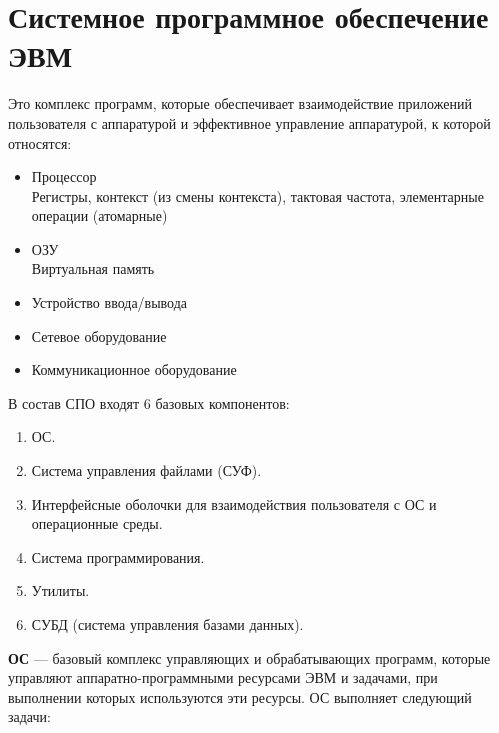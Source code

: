 \section{Системное программное обеспечение ЭВМ}
Это комплекс программ, которые обеспечивает взаимодействие приложений пользователя с
аппаратурой и эффективное управление аппаратурой, к которой относятся:
\begin{itemize}
	\item Процессор\\{\ttfamily Регистры, контекст (из смены контекста), тактовая
		частота, элементарные операции (атомарные)}
	\item ОЗУ\\{\ttfamily Виртуальная память}
	\item Устройство ввода/вывода
	\item Сетевое оборудование
	\item Коммуникационное оборудование
\end{itemize}
В состав СПО входят 6 базовых компонентов:
\begin{enumerate}
	\item ОС.
	\item Система управления файлами (СУФ).
	\item Интерфейсные оболочки для взаимодействия пользователя с ОС и
		операционные среды.
	\item Система программирования.
	\item Утилиты.
	\item СУБД (система управления базами данных).
\end{enumerate}\par
\textbf{ОС} --- базовый комплекс управляющих и обрабатывающих программ, которые управляют
аппаратно-программными ресурсами ЭВМ и задачами, при выполнении которых
используются эти ресурсы. ОС выполняет следующий задачи:
